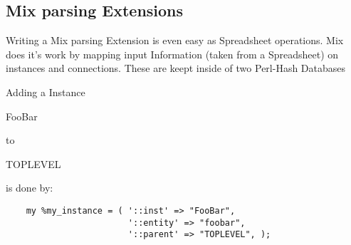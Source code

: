 \documentclass[a4paper,12pt]{article}
\begin{document}
\subsection{Mix parsing Extensions}
Writing a Mix parsing Extension is even easy as Spreadsheet operations. Mix does it's work by mapping input Information (taken from a Spreadsheet) on instances and connections. These are keept inside of two Perl-Hash Databases \begin{tt}%
  Adding a Instance \begin{tt}FooBar\end{tt} to \begin{tt}TOPLEVEL\end{tt} is done by:\newline
\begin{verbatim}
    my %my_instance = ( '::inst' => "FooBar",
                        '::entity' => "foobar",
                        '::parent' => "TOPLEVEL", );


\end{verbatim}
\end{tt}
\end{document}
